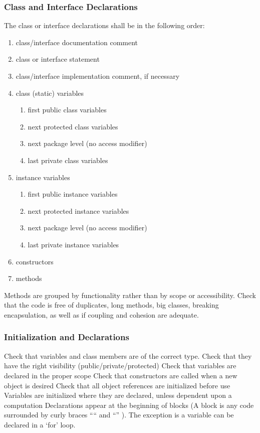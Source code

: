 \subsubsection{Class and Interface Declarations}
\begin{itemize}
		The class or interface declarations shall be in the following order:
		\begin{enumerate}
			\item
				class/interface documentation comment
			\item
				class or interface statement
			\item
				class/interface implementation comment, if necessary
			\item
				class (static) variables
				\begin{enumerate}
					\item first public class variables
					\item next protected class variables
					\item next package level (no access modifier)
					\item last private class variables
				\end{enumerate}
			\item
				instance variables
				\begin{enumerate}
					\item first public instance variables
					\item next protected instance variables
					\item next package level (no access modifier)
					\item last private instance variables
				\end{enumerate}
			\item
				constructors
			\item
				methods
		\end{enumerate}
		Methods are grouped by functionality rather than by scope or accessibility.
		Check that the code is free of duplicates, long methods, big classes, breaking encapsulation, as well as if coupling and cohesion are adequate.
\end{itemize}
%
\subsubsection{Initialization and Declarations}
\begin{itemize}
		Check that variables and class members are of the correct type. Check that they have the right visibility (public/private/protected)
		Check that variables are declared in the proper scope
		Check that constructors are called when a new object is desired
		Check that all object references are initialized before use
		Variables are initialized where they are declared, unless dependent upon a computation
		Declarations appear at the beginning of blocks (A block is any code surrounded by curly braces “{“ and “}” ). The exception is a variable can be declared in a ‘for’ loop.
\end{itemize}
%

